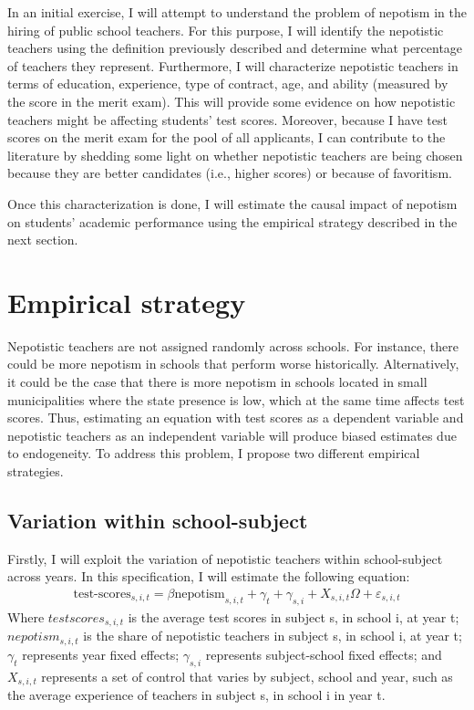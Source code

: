 \documentclass[12pt,runningheads]{article}
\begin{document}
In an initial exercise, I will attempt to understand the problem of nepotism in the hiring of public school teachers. For this purpose, I will identify the nepotistic teachers using the definition previously described and determine what percentage of teachers they represent. Furthermore, I will characterize nepotistic teachers in terms of education, experience, type of contract, age, and ability (measured by the score in the merit exam). This will provide some evidence on how nepotistic teachers might be affecting students' test scores. Moreover, because I have test scores on the merit exam for the pool of all applicants, I can contribute to the literature by shedding some light on whether nepotistic teachers are being chosen because they are better candidates (i.e., higher scores) or because of favoritism. 

Once this characterization is done, I will estimate the causal impact of nepotism on students' academic performance using the empirical strategy described in the next section. 


\section{Empirical strategy} 

Nepotistic teachers are not assigned randomly across schools. For instance, there could be more nepotism in schools that perform worse historically. Alternatively, it could be the case that there is more nepotism in schools located in small municipalities where the state presence is low, which at the same time affects test scores. Thus, estimating an equation with test scores as a dependent variable and nepotistic teachers as an independent variable will produce biased estimates due to endogeneity. To address this problem, I propose two different empirical strategies.

\subsection{Variation within school-subject}

Firstly, I will exploit the variation of nepotistic teachers within school-subject across years. In this specification, I will estimate the following equation:
\begin{align}
\text{test-scores}_{s,i,t}= \beta \text{nepotism}_{s,i,t} + \gamma_t + \gamma_{s,i} + X_{s,i,t}\Omega + \varepsilon_{s,i,t}
\end{align}
Where $test scores_{s,i,t}$ is the average test scores in subject s, in school i, at year t; $nepotism_{s,i,t}$ is the share of nepotistic teachers in subject s, in school i, at year t; $\gamma_t$ represents year fixed effects; $\gamma_{s,i}$ represents subject-school fixed effects; and $X_{s,i,t}$ represents a set of control that varies by subject, school and year, such as the average experience of teachers in subject s, in school i in year t.
\end{document}
